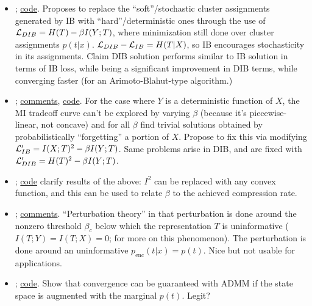 \documentclass[notitlepage,openany,11pt]{report}
\theoremstyle{plain}%
\numberwithin{equation}{section}
\begin{document}
\begin{itemize}
\item \cite{StrouseSchwab:17}; \href{https://github.com/djstrouse/information-bottleneck}{code}. Proposes to replace the ``soft''/stochastic cluster assignments generated by IB with ``hard''/deterministic ones through the use of $\mathcal{L}_{DIB} = H(T) - \beta I(Y;T)$, where minimization still done over cluster assignments $p(t|x)$. $\mathcal{L}_{DIB} - \mathcal{L}_{IB} = H(T|X)$, so IB encourages stochasticity in its assignments. Claim DIB solution performs similar to IB solution in terms of IB loss, while being a significant improvement in DIB terms, while converging faster (for an Arimoto-Blahut-type algorithm.)

\item \cite{KolchinskyEtAl:18}; \href{https://openreview.net/forum?id=rke4HiAcY7}{comments}, \href{https://github.com/artemyk/ibcurve}{code}. For the case where $Y$ is a deterministic function of $X$, the MI tradeoff curve can't be explored by varying $\beta$ (because it's piecewise-linear, not concave) and for all $\beta$ find trivial solutions obtained by probabilistically ``forgetting'' a portion of $X$. Propose to fix this via modifying $\mathcal{L}'_{IB} = I(X;T)^2 - \beta I(Y;T)$. Same problems arise in DIB, and are fixed with $\mathcal{L}'_{DIB} = H(T)^2 - \beta I(Y;T)$.

\item \cite{RodriguezGalvezEtAl:20}; \href{https://github.com/burklight/convex-IB-Lagrangian-PyTorch}{code} clarify results of the above: $I^{2}$ can be replaced with any convex function, and this can be used to relate $\beta$ to the achieved compression rate.

\item \cite{NgampruetikornSchwab:21}; \href{https://openreview.net/forum?id=A2HvBPoSBMs}{comments}. ``Perturbation theory'' in that perturbation is done around the nonzero threshold $\beta_{c}$ below which the representation $T$ is uninformative ($I(T;Y) = I(T;X) =0$; \cite{WuEtAl:19} for more on this phenomenon). The perturbation is done around an uninformative $p_{\text{enc}}(t|x) = p(t)$. Nice but not usable for applications.

\item \cite{HuangGamal:21}; \href{https://github.com/hui811116/ib-admm}{code}. Show that convergence can be guaranteed with ADMM if the state space is augmented with the marginal $p(t)$. Legit?
\end{itemize}
\end{document}

